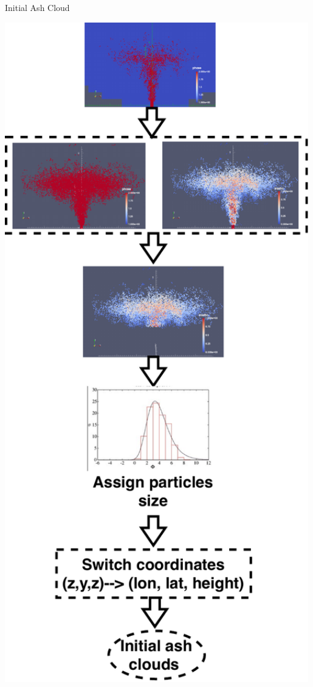 \documentclass{beamer}
\begin{document}
\begin{frame}{Initial Ash Cloud}
\begin{minipage}{.32\textwidth}
\includegraphics[width=0.99\textwidth]{./PPT/Creat_initial_Ash}
\end{minipage} %
%
\end{frame}
\end{document}
